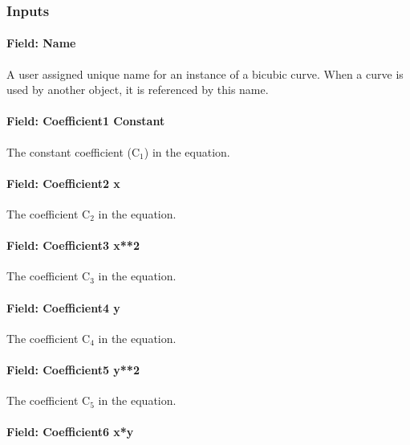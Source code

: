 \subsubsection{Inputs}\label{inputs-6-016}

\paragraph{Field: Name}\label{field-name-6-013}

A user assigned unique name for an instance of a bicubic curve. When a curve is used by another object, it is referenced by this name.

\paragraph{Field: Coefficient1 Constant}\label{field-coefficient1-constant-6}

The constant coefficient (C\(_{1}\)) in the equation.

\paragraph{Field: Coefficient2 x}\label{field-coefficient2-x-4}

The coefficient C\(_{2}\) in the equation.

\paragraph{Field: Coefficient3 x**2}\label{field-coefficient3-x2-3}

The coefficient C\(_{3}\) in the equation.

\paragraph{Field: Coefficient4 y}\label{field-coefficient4-y-1}

The coefficient C\(_{4}\) in the equation.

\paragraph{Field: Coefficient5 y**2}\label{field-coefficient5-y2}

The coefficient C\(_{5}\) in the equation.

\paragraph{Field: Coefficient6 x*y}\label{field-coefficient6-xy}

